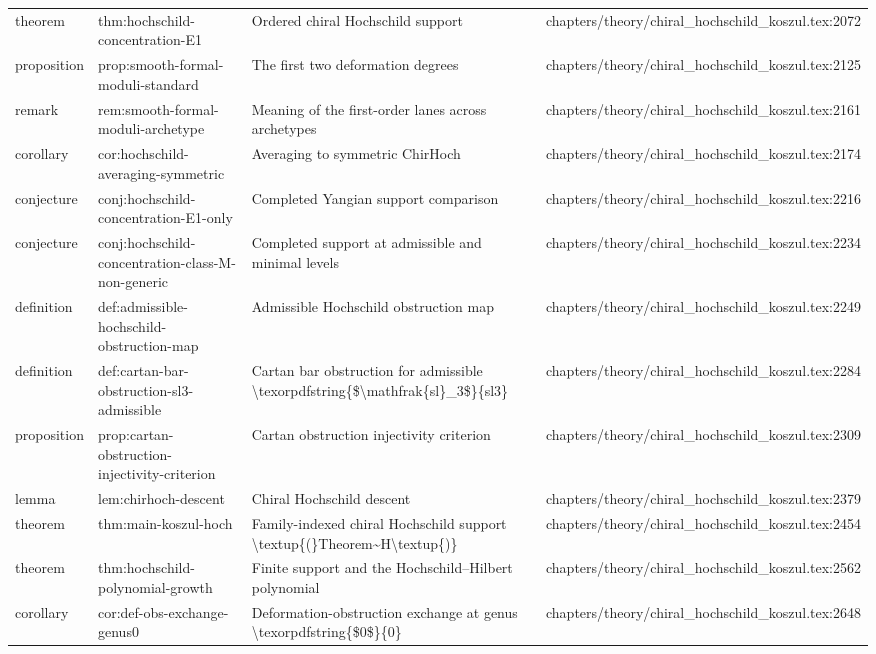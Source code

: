 \documentclass[11pt]{article}
\begin{document}
\begin{longtable}{L{0.10\textwidth}L{0.26\textwidth}L{0.42\textwidth}L{0.22\textwidth}}
theorem & thm:hochschild-concentration-E1 & Ordered chiral Hochschild support & chapters/theory/chiral\_hochschild\_koszul.tex:2072\\
proposition & prop:smooth-formal-moduli-standard & The first two deformation degrees & chapters/theory/chiral\_hochschild\_koszul.tex:2125\\
remark & rem:smooth-formal-moduli-archetype & Meaning of the first-order lanes across archetypes & chapters/theory/chiral\_hochschild\_koszul.tex:2161\\
corollary & cor:hochschild-averaging-symmetric & Averaging to symmetric ChirHoch & chapters/theory/chiral\_hochschild\_koszul.tex:2174\\
conjecture & conj:hochschild-concentration-E1-only & Completed Yangian support comparison & chapters/theory/chiral\_hochschild\_koszul.tex:2216\\
conjecture & conj:hochschild-concentration-class-M-non-generic & Completed support at admissible and minimal levels & chapters/theory/chiral\_hochschild\_koszul.tex:2234\\
definition & def:admissible-hochschild-obstruction-map & Admissible Hochschild obstruction map & chapters/theory/chiral\_hochschild\_koszul.tex:2249\\
definition & def:cartan-bar-obstruction-sl3-admissible & Cartan bar obstruction for admissible \textbackslash{}texorpdfstring\{\$\textbackslash{}mathfrak\{sl\}\_3\$\}\{sl3\} & chapters/theory/chiral\_hochschild\_koszul.tex:2284\\
proposition & prop:cartan-obstruction-injectivity-criterion & Cartan obstruction injectivity criterion & chapters/theory/chiral\_hochschild\_koszul.tex:2309\\
lemma & lem:chirhoch-descent & Chiral Hochschild descent & chapters/theory/chiral\_hochschild\_koszul.tex:2379\\
theorem & thm:main-koszul-hoch & Family-indexed chiral Hochschild support \textbackslash{}textup\{(\}Theorem\textasciitilde{}H\textbackslash{}textup\{)\} & chapters/theory/chiral\_hochschild\_koszul.tex:2454\\
theorem & thm:hochschild-polynomial-growth & Finite support and the Hochschild--Hilbert polynomial & chapters/theory/chiral\_hochschild\_koszul.tex:2562\\
corollary & cor:def-obs-exchange-genus0 & Deformation-obstruction exchange at genus \textbackslash{}texorpdfstring\{\$0\$\}\{0\} & chapters/theory/chiral\_hochschild\_koszul.tex:2648\\

\end{longtable}
\end{document}
